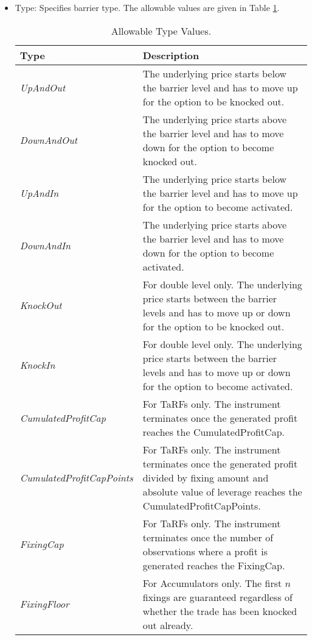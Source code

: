 \begin{itemize}
\item Type: Specifies barrier type.
The allowable values are given in Table \ref{tab:barriertype}. 

\begin{table}[H]
\centering
  \begin{tabular} {|l|p{12cm}|}
    \hline
 \bfseries{Type} & \bfseries{Description} \\
    \hline
 \emph{UpAndOut} & The underlying price starts below the barrier level and has to move up for the option to be knocked out.\\ \hline
 \emph{DownAndOut} & The underlying price starts above the barrier level and has to move down for the option to become knocked out. \\ \hline
 \emph{UpAndIn} & The underlying price starts below the barrier level and has to move up for the option to become activated. \\ \hline
 \emph{DownAndIn} & The underlying price starts above the barrier level and has to move down for the option to become activated.\\ \hline
 \emph{KnockOut} & For double level only. The underlying price starts between the barrier levels and has to move up
 or down for the option to be knocked out. \\ \hline
 \emph{KnockIn} & For double level only. The underlying price starts between the barrier levels and has to move up
 or down for the option to become activated. \\ \hline
 \emph{CumulatedProfitCap} & For TaRFs only. The instrument terminates once the generated profit reaches the CumulatedProfitCap. \\ \hline
 \emph{CumulatedProfitCapPoints} & For TaRFs only. The instrument terminates once the generated profit divided by fixing amount and absolute value of leverage reaches the CumulatedProfitCapPoints. \\ \hline
 \emph{FixingCap} & For TaRFs only. The instrument terminates once the number of observations where a profit is generated reaches the FixingCap.\\ \hline
 \emph{FixingFloor} & For Accumulators only. The first $n$ fixings are guaranteed regardless of whether the trade has been knocked out already.\\ \hline
  \end{tabular}
  \caption{Allowable Type Values.}
  \label{tab:barriertype}
\end{table}


\end{itemize}
